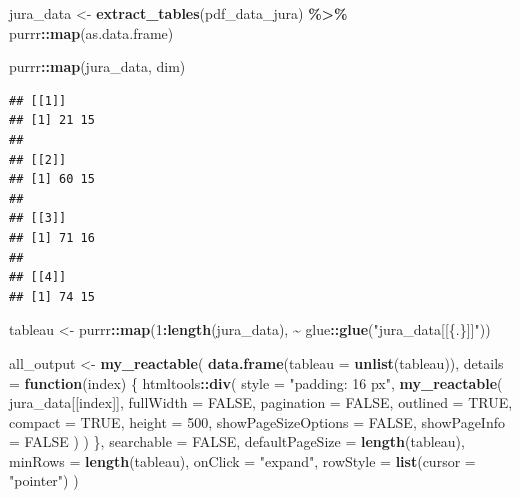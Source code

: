 \documentclass[
  french,
]{book}
\newenvironment{Shaded}{\begin{snugshade}}{\end{snugshade}}
\newcommand{\ControlFlowTok}[1]{\textcolor[rgb]{0.13,0.29,0.53}{\textbf{#1}}}
\newcommand{\DataTypeTok}[1]{\textcolor[rgb]{0.13,0.29,0.53}{#1}}
\newcommand{\DecValTok}[1]{\textcolor[rgb]{0.00,0.00,0.81}{#1}}
\newcommand{\KeywordTok}[1]{\textcolor[rgb]{0.13,0.29,0.53}{\textbf{#1}}}
\newcommand{\NormalTok}[1]{#1}
\newcommand{\OperatorTok}[1]{\textcolor[rgb]{0.81,0.36,0.00}{\textbf{#1}}}
\newcommand{\OtherTok}[1]{\textcolor[rgb]{0.56,0.35,0.01}{#1}}
\newcommand{\StringTok}[1]{\textcolor[rgb]{0.31,0.60,0.02}{#1}}
\begin{document}
\begin{Shaded}
\begin{Highlighting}[]
\NormalTok{jura\_data \textless{}{-}}\StringTok{ }\KeywordTok{extract\_tables}\NormalTok{(pdf\_data\_jura) }\OperatorTok{\%\textgreater{}\%}\StringTok{ }
\StringTok{  }\NormalTok{purrr}\OperatorTok{::}\KeywordTok{map}\NormalTok{(as.data.frame)}

\NormalTok{purrr}\OperatorTok{::}\KeywordTok{map}\NormalTok{(jura\_data, dim)}
\end{Highlighting}
\end{Shaded}

\begin{verbatim}
## [[1]]
## [1] 21 15
## 
## [[2]]
## [1] 60 15
## 
## [[3]]
## [1] 71 16
## 
## [[4]]
## [1] 74 15
\end{verbatim}

\begin{Shaded}
\begin{Highlighting}[]
\NormalTok{tableau \textless{}{-}}\StringTok{ }\NormalTok{purrr}\OperatorTok{::}\KeywordTok{map}\NormalTok{(}\DecValTok{1}\OperatorTok{:}\KeywordTok{length}\NormalTok{(jura\_data), }\OperatorTok{\textasciitilde{}}\StringTok{ }\NormalTok{glue}\OperatorTok{::}\KeywordTok{glue}\NormalTok{(}\StringTok{"jura\_data[[\{.\}]]"}\NormalTok{))}

\NormalTok{all\_output \textless{}{-}}\StringTok{ }\KeywordTok{my\_reactable}\NormalTok{(}
  \KeywordTok{data.frame}\NormalTok{(}\DataTypeTok{tableau =} \KeywordTok{unlist}\NormalTok{(tableau)),}
  \DataTypeTok{details =} \ControlFlowTok{function}\NormalTok{(index) \{}
\NormalTok{    htmltools}\OperatorTok{::}\KeywordTok{div}\NormalTok{(}
      \DataTypeTok{style =} \StringTok{"padding: 16 px"}\NormalTok{,}
      \KeywordTok{my\_reactable}\NormalTok{(}
\NormalTok{        jura\_data[[index]],}
        \DataTypeTok{fullWidth =} \OtherTok{FALSE}\NormalTok{,}
        \DataTypeTok{pagination =} \OtherTok{FALSE}\NormalTok{,}
        \DataTypeTok{outlined =} \OtherTok{TRUE}\NormalTok{,}
        \DataTypeTok{compact =} \OtherTok{TRUE}\NormalTok{,}
        \DataTypeTok{height =} \DecValTok{500}\NormalTok{,}
        \DataTypeTok{showPageSizeOptions =} \OtherTok{FALSE}\NormalTok{,}
        \DataTypeTok{showPageInfo =} \OtherTok{FALSE}
\NormalTok{      )}
\NormalTok{    )}
\NormalTok{  \},}
  \DataTypeTok{searchable =} \OtherTok{FALSE}\NormalTok{,}
  \DataTypeTok{defaultPageSize =} \KeywordTok{length}\NormalTok{(tableau), }
  \DataTypeTok{minRows =} \KeywordTok{length}\NormalTok{(tableau),}
  \DataTypeTok{onClick =} \StringTok{"expand"}\NormalTok{,}
  \DataTypeTok{rowStyle =} \KeywordTok{list}\NormalTok{(}\DataTypeTok{cursor =} \StringTok{"pointer"}\NormalTok{)}
\NormalTok{)}
\end{Highlighting}
\end{Shaded}
\end{document}
